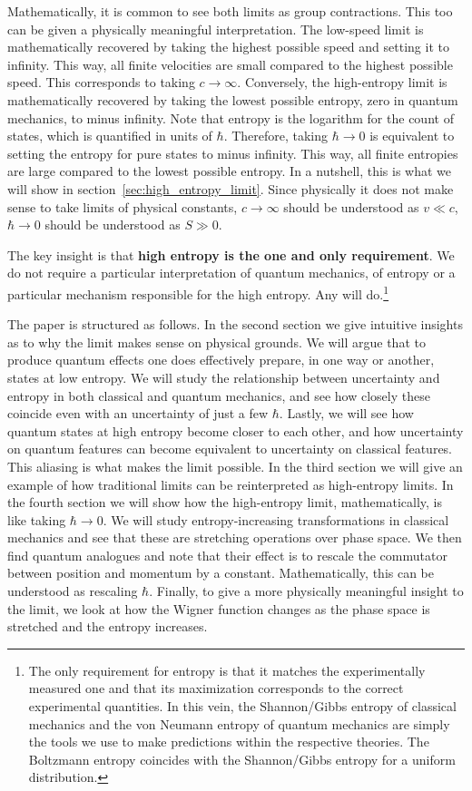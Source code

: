 \documentclass{SciPost}
\begin{document}
Mathematically, it is common to see both limits as group contractions. This too can be given a physically meaningful interpretation. The low-speed limit is mathematically recovered by taking the highest possible speed and setting it to infinity. This way, all finite velocities are small compared to the highest possible speed. This corresponds to taking $c \to \infty$. Conversely, the high-entropy limit is mathematically recovered by taking the lowest possible entropy, zero in quantum mechanics, to minus infinity. Note that entropy is the logarithm for the count of states, which is quantified in units of $\hbar$. Therefore, taking $\hbar \to 0$ is equivalent to setting the entropy for pure states to minus infinity. This way, all finite entropies are large compared to the lowest possible entropy. In a nutshell, this is what we will show in section~\ref{sec:high_entropy_limit}. Since physically it does not make sense to take limits of physical constants, $c \to \infty$ should be understood as $v \ll c$, $\hbar \to 0$ should be understood as $S \gg 0$.

The key insight is that \textbf{high entropy is the one and only requirement}. We do not require a particular interpretation of quantum mechanics, of entropy or a particular mechanism responsible for the high entropy. Any will do.\footnote{The only requirement for entropy is that it matches the experimentally measured one and that its maximization corresponds to the correct experimental quantities. In this vein, the Shannon/Gibbs entropy of classical mechanics and the von Neumann entropy of quantum mechanics are simply the tools we use to make predictions within the respective theories. The Boltzmann entropy coincides with the Shannon/Gibbs entropy for a uniform distribution. }

The paper is structured as follows. In the second section we give intuitive insights as to why the limit makes sense on physical grounds. We will argue that to produce quantum effects one does effectively prepare, in one way or another, states at low entropy. We will study the relationship between uncertainty and entropy in both classical and quantum mechanics, and see how closely these coincide even with an uncertainty of just a few $\hbar$. Lastly, we will see how quantum states at high entropy become closer to each other, and how uncertainty on quantum features can become equivalent to uncertainty on classical features. This aliasing is what makes the limit possible. In the third section we will give an example of how traditional limits can be reinterpreted as high-entropy limits. In the fourth section we will show how the high-entropy limit, mathematically, is like taking $\hbar \to 0$. We will study entropy-increasing transformations in classical mechanics and see that these are stretching operations over phase space. We then find quantum analogues and note that their effect is to rescale the commutator between position and momentum by a constant. Mathematically, this can be understood as rescaling $\hbar$. Finally, to give a more physically meaningful insight to the limit, we look at how the Wigner function changes as the phase space is stretched and the entropy increases.
\end{document}
